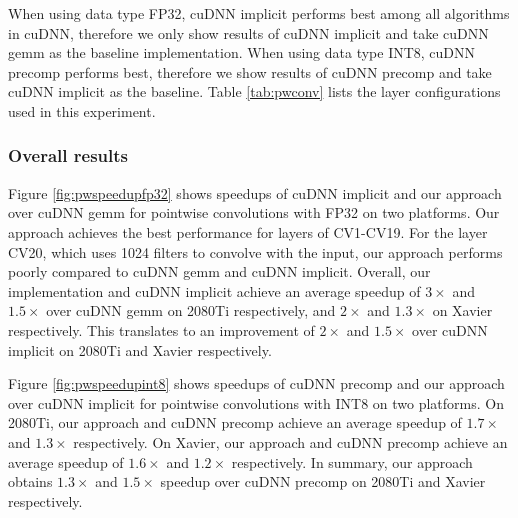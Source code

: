 When using data type FP32, cuDNN implicit performs best among all algorithms in cuDNN, therefore we only show results of cuDNN implicit and take cuDNN gemm as the baseline implementation.
When using data type INT8, cuDNN precomp performs best, therefore we show results of cuDNN precomp and take cuDNN implicit as the baseline.
Table \ref{tab:pwconv} lists the layer configurations used in this experiment.

\subsubsection{Overall results} Figure \ref{fig:pwspeedupfp32} shows speedups of cuDNN implicit and our approach over cuDNN gemm for pointwise convolutions with FP32 on two platforms.
Our approach achieves the best performance for layers of CV1-CV19.
For the layer CV20, which uses 1024 filters to convolve with the input, our approach performs poorly compared to cuDNN gemm and cuDNN implicit.
Overall, our implementation and cuDNN implicit achieve an average speedup of $3\times$ and $1.5\times$ over cuDNN gemm on 2080Ti respectively, and $2\times$ and $1.3\times$ on Xavier respectively. 
This translates to an improvement of $2\times$ and $1.5\times$ over cuDNN implicit on 2080Ti and Xavier respectively.

Figure \ref{fig:pwspeedupint8} shows speedups of cuDNN precomp and our approach over cuDNN implicit for pointwise convolutions with INT8 on two platforms.
On 2080Ti, our approach and cuDNN precomp achieve an average speedup of $1.7\times$ and $1.3\times$ respectively.
On Xavier, our approach and cuDNN precomp achieve an average speedup of $1.6\times$ and $1.2\times$ respectively.
In summary, our approach obtains $1.3\times$ and $1.5\times$ speedup over cuDNN precomp on 2080Ti and Xavier respectively.


